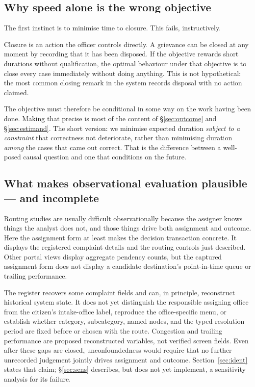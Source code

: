 \documentclass[11pt,a4paper]{article}
\theoremstyle{plain}
\theoremstyle{definition}
\theoremstyle{remark}
\begin{document}
\subsection{Why speed alone is the wrong objective}

The first instinct is to minimise time to closure. This fails, instructively.

Closure is an action the officer controls directly. A grievance can be closed at any moment by
recording that it has been disposed. If the objective rewards short durations without
qualification, the optimal behaviour under that objective is to close every case immediately
without doing anything. This is not hypothetical: the most common closing remark in the system
records disposal with no action claimed.

The objective must therefore be conditional in some way on the work having been done. Making
that precise is most of the content of \S\ref{sec:outcome} and \S\ref{sec:estimand}. The short
version: we minimise expected duration \emph{subject to a constraint} that correctness not
deteriorate, rather than minimising duration \emph{among} the cases that came out correct.
That is the difference between a well-posed causal question and one that conditions on the
future.

\subsection{What makes observational evaluation plausible --- and incomplete}

Routing studies are usually difficult observationally because the assigner knows things the
analyst does not, and those things drive both assignment and outcome. Here the assignment form
at least makes the decision transaction concrete. It displays the registered complaint details
and the routing controls just described. Other portal views display aggregate pendency counts,
but the captured assignment form does not display a candidate destination's point-in-time queue
or trailing performance.

The register recovers some complaint fields and can, in principle, reconstruct historical
system state. It does not yet distinguish the responsible assigning office from the citizen's
intake-office label, reproduce the office-specific menu, or establish whether category,
subcategory, named nodes, and the typed resolution period are fixed before or chosen with the
route. Congestion and trailing performance are proposed reconstructed variables, not verified
screen fields. Even after these gaps are closed, unconfoundedness would require that no further
unrecorded judgement jointly drives assignment and outcome. Section~\ref{sec:ident} states that
claim; \S\ref{sec:sens} describes, but does not yet implement, a sensitivity analysis for its
failure.
\end{document}
